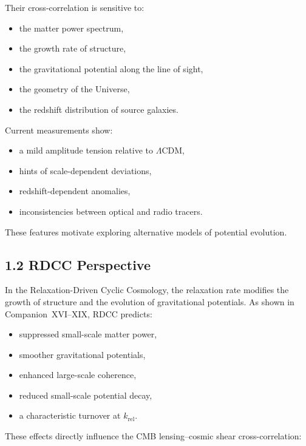 \documentclass[11pt,a4paper]{article}
\begin{document}
Their cross-correlation is sensitive to:

\begin{itemize}
    \item the matter power spectrum,
    \item the growth rate of structure,
    \item the gravitational potential along the line of sight,
    \item the geometry of the Universe,
    \item the redshift distribution of source galaxies.
\end{itemize}

Current measurements show:

\begin{itemize}
    \item a mild amplitude tension relative to $\Lambda$CDM,
    \item hints of scale-dependent deviations,
    \item redshift-dependent anomalies,
    \item inconsistencies between optical and radio tracers.
\end{itemize}

These features motivate exploring alternative models of potential evolution.

\subsection*{1.2 RDCC Perspective}

In the Relaxation-Driven Cyclic Cosmology, the relaxation rate modifies the growth of 
structure and the evolution of gravitational potentials. As shown in Companion~XVI--XIX, 
RDCC predicts:

\begin{itemize}
    \item suppressed small-scale matter power,
    \item smoother gravitational potentials,
    \item enhanced large-scale coherence,
    \item reduced small-scale potential decay,
    \item a characteristic turnover at $k_{\mathrm{rel}}$.
\end{itemize}

These effects directly influence the CMB lensing--cosmic shear cross-correlation:
\end{document}
